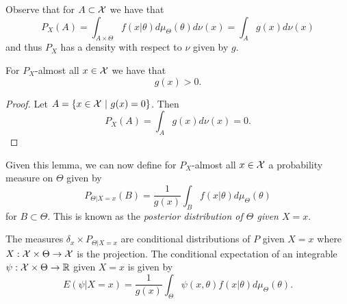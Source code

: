 \documentclass[twoside, a4paper, 10pt]{amsart}
\begin{document}
Observe that for $A \subset \mathcal{X}$ we have that $$P_X(A) = \int_{A \times \Theta} f(x|\theta) d\mu_{\Theta}(\theta) d\nu(x) = \int_{A} g(x) d\nu(x)$$ and thus $P_X$ has a density with respect to $\nu$ given by $g$.
\begin{lemma} For $P_X$-almost all $x \in \mathcal{X} $ we have that $$g(x)  > 0.$$

\end{lemma}

\begin{proof} Let $A = \{x \in \mathcal{X} ~|~ g(x) = 0 \}$. Then $$P_X(A) = \int_{A} g(x) d\nu(x) = 0.  $$

\end{proof}

Given this lemma, we can now define for $P_X$-almost all $x \in \mathcal{X}$ a probability measure on $\Theta$ given by $$P_{\Theta|X=x}(B) = \frac{1}{g(x)} \int_{B} f(x|\theta) d\mu_{\Theta}(\theta)$$ for $B \subset \Theta$. This is known as the \textit{posterior distribution of $\Theta$ given $X = x$}.

\begin{lemma} The measures $\delta_x \times P_{\Theta |X=x}$ are conditional distributions of $P$ given $X=x$ where $X:\mathcal{X} \times \Theta \to \mathcal{X}$ is the projection. The conditional expectation of an integrable $\psi:\mathcal{X} \times \Theta \to \mathbb{R}$ given $X=x$ is given by $$E(\psi | X=x) = \frac{1}{g(x)}\int_{\Theta} \psi(x,\theta) f(x|\theta) d\mu_{\Theta}(\theta).$$ 

\end{lemma}
\end{document}
